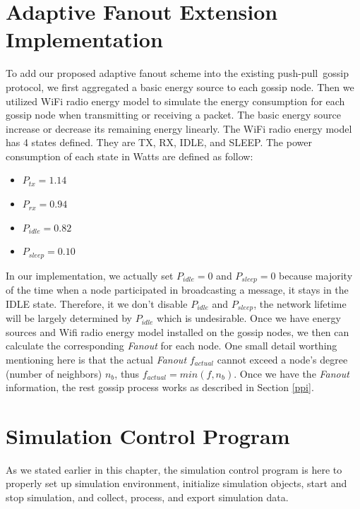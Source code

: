 \documentclass[onehalf,11pt]{beavtex}
\newcommand{\gp}{gossip protocol}
\newcommand{\msg}{message}
\newcommand{\pp}{push-pull}
\begin{document}
\section{Adaptive Fanout Extension Implementation}

To add our proposed adaptive fanout scheme into the existing \pp ~\gp, we first aggregated a basic energy source to each gossip node. Then we utilized WiFi radio energy model to simulate the energy consumption for each gossip node when transmitting or receiving a packet. The basic energy source increase or decrease its remaining energy linearly. The WiFi radio energy model has 4 states defined. They are TX, RX, IDLE, and SLEEP. The power consumption of each state in Watts are defined as follow:

\begin{itemize}
	\item $P_{tx}=1.14$
	\item $P_{rx}=0.94$
	\item $P_{idle}=0.82$
	\item $P_{sleep}=0.10$
\end{itemize}

In our implementation, we actually set $P_{idle}=0$ and $P_{sleep}=0$ because majority of the time when a node participated in broadcasting a \msg, it stays in the IDLE state. Therefore, it we don't disable $P_{idle}$ and $P_{sleep}$, the network lifetime will be largely determined by $P_{idle}$ which is undesirable. Once we have energy sources and Wifi radio energy model installed on the gossip nodes, we then can calculate the corresponding \emph{Fanout} for each node. One small detail worthing mentioning here is that the actual \emph{Fanout} $f_{actual}$ cannot exceed a node's degree (number of neighbors) $n_b$, thus $f_{actual} = min(f, n_b)$. Once we have the \emph{Fanout} information, the rest gossip process works as described in Section \ref{ppi}.

\section{Simulation Control Program}

As we stated earlier in this chapter, the simulation control program is here to properly set up simulation environment, initialize simulation objects, start and stop simulation, and collect, process, and export simulation data.
\end{document}
